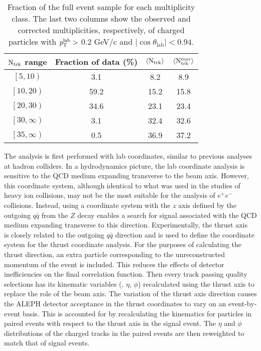 \documentclass[aps,prl,twocolumn,superscriptaddress,groupedaddress]{revtex4}  %
\begin{document}
\begin{table}[t]\centering
\begin{tabular}{ cccc}
 \hline
 $\rm N_{\text{trk}}$ range & Fraction of data (\%) & $\langle {\rm N_{\text{trk}}}\rangle$ & $\langle {\rm N_{\text{trk}}^{\text{corr}}}\rangle$\\
 \hline
 $\left[ \mathrm{5,10} \right)$&   3.1& 8.2& 8.9\\
 $\left[ \mathrm{10,20} \right)$&   59.2& 15.2& 15.8\\
 $\left[ \mathrm{20,30} \right)$&   34.6& 23.1& 23.4\\
 $\left[ \mathrm{30,\infty} \right)$&   3.1& 32.4& 32.6\\
 $\left[ \mathrm{35,\infty} \right)$&   0.5& 36.9& 37.2\\
 \hline
\end{tabular}
\caption{Fraction of the full event sample for each multiplicity class. The last two columns
show the observed and corrected multiplicities, respectively, of charged particles with $p_{\rm T}^{\rm lab} >$ 0.2 GeV/c and $|\cos{\theta_{\text{lab}}}|<0.94$.}
\label{fig:table2}
\end{table}

The analysis is first performed with lab coordinates, similar to previous analyses at hadron colliders. In a hydrodynamics picture, the lab coordinate analysis is sensitive to the QCD medium expanding transverse to the beam axis. However, this coordinate system, although identical to what was used in the studies of heavy ion collisions, may not be the most suitable for the analysis of $e^+e^-$ collisions. Instead, using a coordinate system with the $z$ axis defined by the outgoing $q\bar{q}$ from the $Z$ decay enables a search for signal associated with the QCD medium expanding transverse to this direction. Experimentally, the thrust axis~\cite{Farhi:1977sg} is closely related to the outgoing $q\bar{q}$ direction and is used to define the coordinate system for the thrust coordinate analysis. For the purposes of calculating the thrust direction, an extra particle corresponding to the unreconstructed momentum of the event is included.  This reduces the effects of detector inefficiencies on the final correlation function.  Then every track passing quality selections has its kinematic variables (\pt, $\eta$, $\phi$) recalculated using the thrust axis to replace the role of the beam axis. The variation of the thrust axis direction causes the ALEPH detector acceptance in the thrust coordinates to vary on an event-by-event basis. This is accounted for by recalculating the kinematics for particles in paired events with respect to the thrust axis in the signal event. The $\eta$ and $\phi$ distributions of the charged tracks in the paired events are then reweighted to match that of signal events. 
\end{document}
